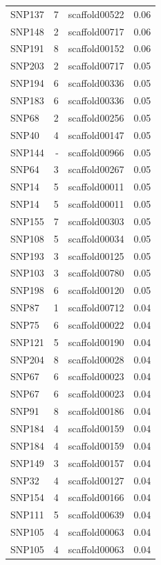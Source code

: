 \begin{longtable}{lrlr}
  SNP137 &   7 & scaffold00522 & 0.06 \\ 
  SNP148 &   2 & scaffold00717 & 0.06 \\ 
  SNP191 &   8 & scaffold00152 & 0.06 \\ 
  SNP203 &   2 & scaffold00717 & 0.05 \\ 
  SNP194 &   6 & scaffold00336 & 0.05 \\ 
  SNP183 &   6 & scaffold00336 & 0.05 \\ 
  SNP68 &   2 & scaffold00256 & 0.05 \\ 
  SNP40 &   4 & scaffold00147 & 0.05 \\ 
  SNP144 & - & scaffold00966 & 0.05 \\ 
  SNP64 &   3 & scaffold00267 & 0.05 \\ 
  SNP14 &   5 & scaffold00011 & 0.05 \\ 
  SNP14 &   5 & scaffold00011 & 0.05 \\ 
  SNP155 &   7 & scaffold00303 & 0.05 \\ 
  SNP108 &   5 & scaffold00034 & 0.05 \\ 
  SNP193 &   3 & scaffold00125 & 0.05 \\ 
  SNP103 &   3 & scaffold00780 & 0.05 \\ 
  SNP198 &   6 & scaffold00120 & 0.05 \\ 
  SNP87 &   1 & scaffold00712 & 0.04 \\ 
  SNP75 &   6 & scaffold00022 & 0.04 \\ 
  SNP121 &   5 & scaffold00190 & 0.04 \\ 
  SNP204 &   8 & scaffold00028 & 0.04 \\ 
  SNP67 &   6 & scaffold00023 & 0.04 \\ 
  SNP67 &   6 & scaffold00023 & 0.04 \\ 
  SNP91 &   8 & scaffold00186 & 0.04 \\ 
  SNP184 &   4 & scaffold00159 & 0.04 \\ 
  SNP184 &   4 & scaffold00159 & 0.04 \\ 
  SNP149 &   3 & scaffold00157 & 0.04 \\ 
  SNP32 &   4 & scaffold00127 & 0.04 \\ 
  SNP154 &   4 & scaffold00166 & 0.04 \\ 
  SNP111 &   5 & scaffold00639 & 0.04 \\ 
  SNP105 &   4 & scaffold00063 & 0.04 \\ 
  SNP105 &   4 & scaffold00063 & 0.04 \\ 

\end{longtable}

